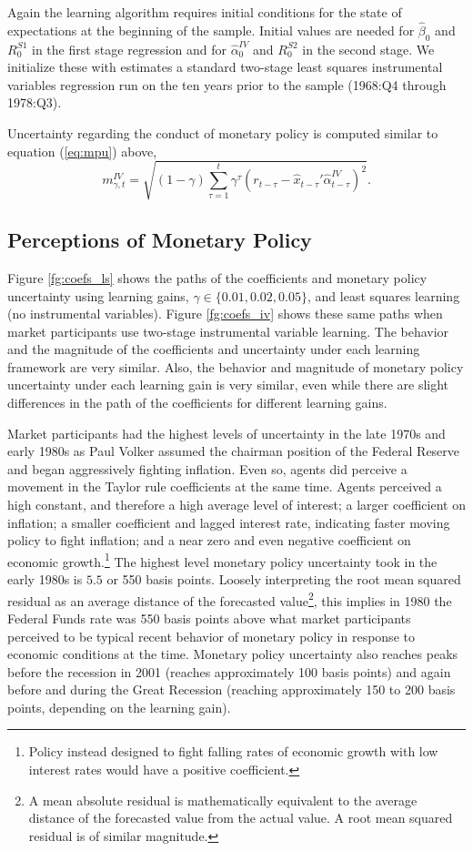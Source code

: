 \documentclass[12pt]{article}
\newcommand{\beq}{\begin{equation}}
\newcommand{\eeq}{\end{equation}}
\newcommand{\ds}{\displaystyle}
\begin{document}
Again the learning algorithm requires initial conditions for the state of expectations at the beginning of the sample.  Initial values are needed for $\hat{\beta}_0$ and $R_0^{S1}$ in the first stage regression and for $\hat{\alpha}_0^{IV}$ and $R_0^{S2}$ in the second stage.  We initialize these with estimates a standard two-stage least squares instrumental variables regression run on the ten years prior to the sample (1968:Q4 through 1978:Q3).

Uncertainty regarding the conduct of monetary policy is computed similar to equation (\ref{eq:mpu}) above,
\beq \label{eq:mpuiv} m_{\gamma,t}^{IV} = \sqrt{ (1-\gamma) \ds \sum_{\tau=1}^{t} \gamma^{\tau} (r_{t-\tau} - \hat{x}_{t-\tau}'\hat{\alpha}_{t-\tau}^{IV} )^2}. \eeq  

\subsection{Perceptions of Monetary Policy}
Figure \ref{fg:coefs_ls} shows the paths of the coefficients and monetary policy uncertainty using learning gains, $\gamma \in \{0.01, 0.02, 0.05\}$, and least squares learning (no instrumental variables).  Figure \ref{fg:coefs_iv} shows these same paths when market participants use two-stage instrumental variable learning.  The behavior and the magnitude of the coefficients and uncertainty under each learning framework are very similar.  Also, the behavior and magnitude of monetary policy uncertainty under each learning gain is very similar, even while there are slight differences in the path of the coefficients for different learning gains.  

Market participants had the highest levels of uncertainty in the late 1970s and early 1980s as Paul Volker assumed the chairman position of the Federal Reserve and began aggressively fighting inflation.  Even so, agents did perceive a movement in the Taylor rule coefficients at the same time.  Agents perceived a high constant, and therefore a high average level of interest; a larger coefficient on inflation; a smaller coefficient and lagged interest rate, indicating faster moving policy to fight inflation; and a near zero and even negative coefficient on economic growth.\footnote{Policy instead designed to fight falling rates of economic growth with low interest rates would have a positive coefficient.}  The highest level monetary policy uncertainty took in the early 1980s is $5.5$ or 550 basis points.  Loosely interpreting the root mean squared residual as an average distance of the forecasted value\footnote{A mean absolute residual is mathematically equivalent to the average distance of the forecasted value from the actual value.  A root mean squared residual is of similar magnitude.}, this implies in 1980 the Federal Funds rate was 550 basis points above what market participants perceived to be typical recent behavior of monetary policy in response to economic conditions at the time.  Monetary policy uncertainty also reaches peaks before the recession in 2001 (reaches approximately 100 basis points) and again before and during the Great Recession (reaching approximately 150 to 200 basis points, depending on the learning gain).  
\end{document}
